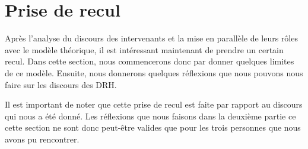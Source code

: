 \section{Prise de recul}

Après l'analyse du discours des intervenants et la mise en parallèle de leurs rôles avec le modèle théorique, il est intéressant maintenant de prendre un certain recul. Dans cette section, nous commencerons donc par donner quelques limites de ce modèle. Ensuite, nous donnerons quelques  réflexions que nous pouvons nous faire sur les discours des DRH.\newline

Il est important de noter que cette prise de recul est faite par rapport au discours qui nous a été donné. Les réflexions que nous faisons dans la deuxième partie ce cette section ne sont donc peut-être valides que pour les trois personnes que nous avons pu rencontrer. \newline